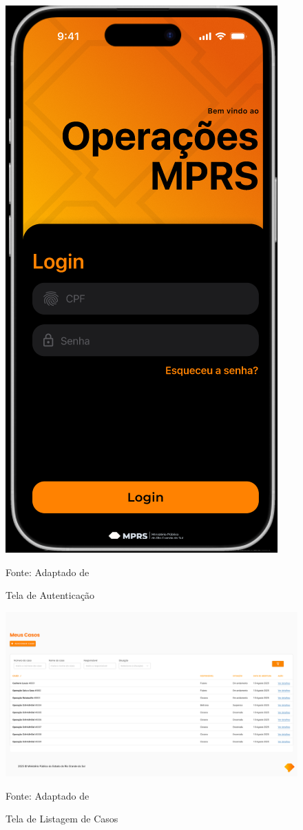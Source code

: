   \begin{figure}[H]
    \centering
    \small
    \includegraphics[width=0.5\linewidth]{conteudo//2 - ages I//conteudo//figures//tela-login.png}
    \caption{Tela de Autenticação}
    Fonte: Adaptado de \textcites{figma-Opercoes GAECO}
    \label{fig:tela-login}
  \end{figure}

  \begin{figure}[H]
    \centering
    \small
    \includegraphics[width=1\linewidth]{conteudo//2 - ages I//conteudo//figures//tela-home.png}
    \caption{Tela de Listagem de Casos}
    Fonte: Adaptado de \textcites{figma-vincula}
    \label{fig:tela-home}
  \end{figure}

